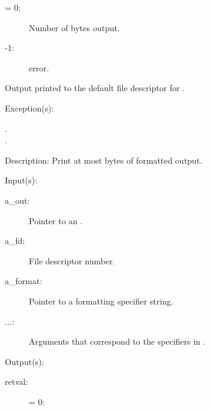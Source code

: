 \begin{capi}
\begin{capilist}
\begin{description}
		\item[retval: ]
			\begin{description}\item[]
			\item[{\gt}= 0: ]
				Number of bytes output.
			\item[-1: ]
				 error.
			\end{description}
		\item{Output printed to the default file descriptor for
			.}
		\end{description}
	\item[Exception(s): ]
		\begin{description}\item[]
		\item[.]
		\item[.]
		\end{description}
	\item[Description: ]
		Print at most  bytes of formatted output.
	\end{capilist}
\label{out_put_f}
\label{_cw_out_put_f}
	\begin{capilist}
	\item[Input(s): ]
		\begin{description}\item[]
		\item[a\_out: ]
			Pointer to an .
		\item[a\_fd: ]
			File descriptor number.
		\item[a\_format: ]
			Pointer to a formatting specifier string.
		\item[...: ]
			Arguments that correspond to the specifiers in
			.
		\end{description}
	\item[Output(s): ]
		\begin{description}\item[]
		\item[retval: ]
			\begin{description}\item[]
			\item[{\gt}= 0: ]

\end{description}
\end{description}
\end{capilist}
\end{capi}
